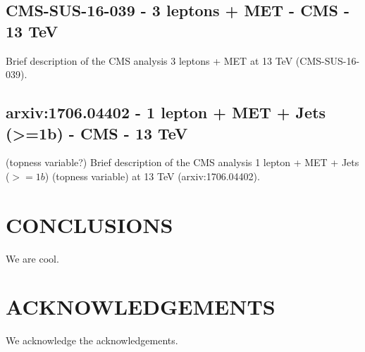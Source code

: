 \documentclass[11pt]{cernrep}
\begin{document}
\subsection{CMS-SUS-16-039 - 3 leptons + MET - CMS - 13 TeV}
Brief description of the CMS analysis 3 leptons + MET at 13 TeV (CMS-SUS-16-039).

\subsection{arxiv:1706.04402 - 1 lepton + MET + Jets (>=1b) - CMS - 13 TeV} (topness variable?)
Brief description of the CMS analysis 1 lepton + MET + Jets ($>=1b$) (topness variable) at 13 TeV (arxiv:1706.04402).

\section*{CONCLUSIONS}
We are cool.

\section*{ACKNOWLEDGEMENTS}
We acknowledge the acknowledgements.


\end{document}
